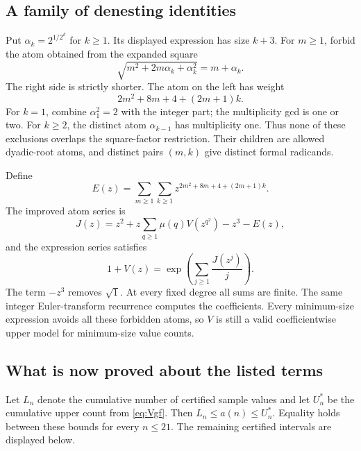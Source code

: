 \documentclass[11pt,letterpaper]{article}
\numberwithin{equation}{section}
\theoremstyle{definition}
\begin{document}
\subsection{A family of denesting identities}

Put $\alpha_k=2^{1/2^k}$ for $k\ge1$. Its displayed expression has size $k+3$.
For $m\ge1$, forbid the atom obtained from the expanded square
\begin{equation}\label{eq:family}
 \sqrt{m^2+2m\alpha_k+\alpha_k^2}=m+\alpha_k.
\end{equation}
The right side is strictly shorter.
The atom on the left has weight
\begin{equation}\label{eq:familyweight}
 2m^2+8m+4+(2m+1)k.
\end{equation}
For $k=1$, combine $\alpha_1^2=2$ with the integer part; the multiplicity gcd
is one or two. For $k\ge2$, the distinct atom $\alpha_{k-1}$ has multiplicity
one. Thus none of these exclusions overlaps the square-factor restriction.
Their children are allowed dyadic-root atoms, and distinct pairs $(m,k)$
give distinct formal radicands.

Define
\begin{equation}\label{eq:Efamily}
 E(z)=\sum_{m\ge1}\sum_{k\ge1}
 z^{2m^2+8m+4+(2m+1)k}.
\end{equation}
The improved atom series is
\begin{equation}\label{eq:improvedatom}
 J(z)=z^2+z\sum_{q\ge1}\mu(q)V(z^{q^2})-z^3-E(z),
\end{equation}
and the expression series satisfies
\begin{equation}\label{eq:Vgf}
 1+V(z)=\exp\left(\sum_{j\ge1}\frac{J(z^j)}j\right).
\end{equation}
The term $-z^3$ removes $\sqrt1$. At every fixed degree all sums are finite.
The same integer Euler-transform recurrence computes the coefficients.
Every minimum-size expression avoids all these forbidden atoms, so $V$ is
still a valid coefficientwise upper model for minimum-size value counts.

\subsection{What is now proved about the listed terms}

Let $L_n$ denote the cumulative number of certified sample values and let
$U_n^*$ be the cumulative upper count from \eqref{eq:Vgf}. Then
$L_n\le a(n)\le U_n^*$. Equality holds between these bounds for every
$n\le21$. The remaining certified intervals are displayed below.
\end{document}

